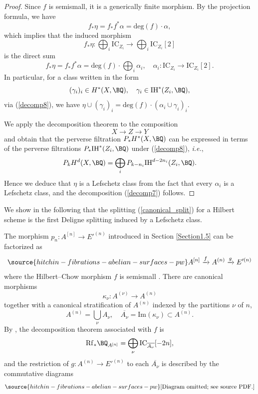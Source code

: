 \begin{proof}
Since $f$ is semismall, it is a generically finite morphism. By the projection formula, we have
\[
f_\ast \eta = f_*f^* \alpha = \mathrm{deg}(f)\cdot  \alpha,
\]
which implies that the induced morphism
\[
f_\ast \eta: \bigoplus_i \mathrm{IC}_{Z_i} \to \bigoplus_i\mathrm{IC}_{Z_i}[2]
\]
is the direct sum
\[
f_\ast \eta = f_*f^* \alpha = \mathrm{deg}(f) \cdot \bigoplus_i \alpha_i,\quad \alpha_i: \mathrm{IC}_{Z_i} \to \mathrm{IC}_{Z_i}[2].
\]
In particular, for a class written in the form
\[
(\gamma_i)_i \in H^*(X, \BQ), \quad \gamma_i \in \mathrm{IH}^{*}(Z_i, \BQ),
\]
via (\ref{decomp8}), we have $\eta \cup (\gamma_i)_i = \mathrm{deg}(f)\cdot(\alpha_i \cup \gamma_i)_i$.

We apply the decomposition theorem to the composition
\[
X \to Z \to Y
\]
and obtain that the perverse filtration $P_*H^*(X, \BQ)$ can be expressed in terms of the perverse filtrations $P_*\mathrm{IH}^*(Z_i, \BQ)$ under (\ref{decomp8}), \emph{i.e.},
\[
P_kH^d(X, \BQ) = \bigoplus_i P_{k-n_i}\mathrm{IH}^{d-2n_i}(Z_i, \BQ).
\]
Hence we deduce that $\eta$ is a Lefschetz class from the fact that every $\alpha_i$ is a Lefschetz class, and the decomposition (\ref{decomp7}) follows.
\end{proof}

We show in the following that the splitting (\ref{canonical_split}) for a Hilbert scheme is the first Deligne splitting induced by a Lefschetz class.

The morphism $p_n: A^{[n]} \to E'^{(n)}$ introduced in Section \ref{Section1.5} can be factorized as
\begin{equation}\label{factorization_Hilb}
\source{hitchin-fibrations-abelian-surfaces-pw}
A^{[n]} \xrightarrow{f} A^{(n)} \xrightarrow{g} E'^{(n)}
\end{equation}
where the Hilbert--Chow morphism $f$ is semismall \cite{Go2}. There are canonical morphisms
\[
\kappa_\nu: A^{(\nu)} \to A^{(n)}
\]
together with a canonical stratification of $A^{(n)}$ indexed by the partitions $\nu$ of $n$,
\[
A^{(n)} = \bigcup_\nu A_\nu, \quad \overline{A_\nu} = \mathrm{Im}(\kappa_\nu) \subset A^{(n)}.
\]
By \cite[Theorem 3]{Go2}, the decomposition theorem associated with $f$ is
\[
\mathrm{Rf}_* \BQ_{A^{[n]}} = \bigoplus_{\nu} \mathrm{IC}_{\overline{A_\nu}} [-2n],
\]
and the restriction of $g: A^{(n)} \to E'^{(n)}$ to each $\overline{A_\nu}$ is described by the commutative diagrams
\begin{equation}\label{diagram9}
\source{hitchin-fibrations-abelian-surfaces-pw}
\text{[Diagram omitted; see source PDF.]}
\end{equation}

